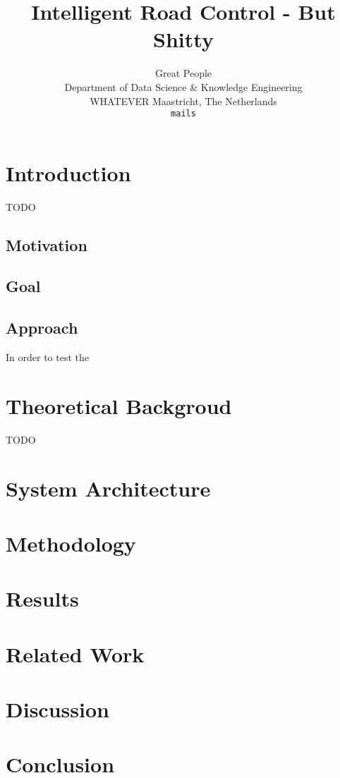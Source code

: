 \documentclass[10pt]{article}
\title{Intelligent Road Control - But Shitty}
\author{Great People \\
	Department of Data Science \& Knowledge Engineering\\
	WHATEVER Maastricht, The Netherlands\\
	{\tt mails}
  }
\begin{document}
\maketitle

\begin{abstract}
	
\end{abstract}

\section{Introduction}
TODO

\subsection{Motivation}

\subsection{Goal}

\subsection{Approach}
In order to test the 

\section{Theoretical Backgroud}
TODO
	
\section{System Architecture}
\lipsum[2-3]
	
\section{Methodology}
\lipsum[2-3]

\section{Results}
\lipsum[2-3]

\section{Related Work}
\lipsum[2-3]

\section{Discussion}
\lipsum[2-3]
	
\section{Conclusion}
\lipsum[2-3]

{\tiny\printbibliography}
\end{document}

